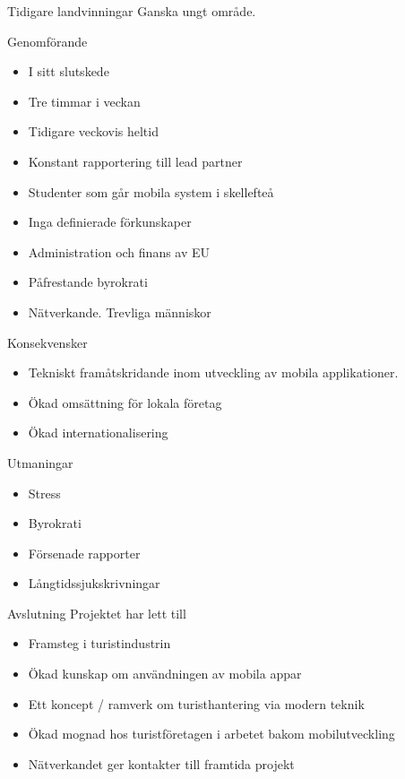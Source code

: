 \documentclass{beamer}
\begin{document}
	\begin{frame}{Tidigare landvinningar}
		Ganska ungt område.
	\end{frame}

	\begin{frame}{Genomförande}
		\begin{itemize}
			\item<1-> I sitt slutskede
			\item<2-> Tre timmar i veckan
			\item<3-> Tidigare veckovis heltid
			\item<4-> Konstant rapportering till lead partner
			\item<5-> Studenter som går mobila system i skellefteå
			\item<6-> Inga definierade förkunskaper
			\item<7-> Administration och finans av EU
			\item<8-> Påfrestande byrokrati
			\item<9-> Nätverkande. Trevliga människor
		\end{itemize}
	\end{frame}

	\begin{frame}{Konsekvensker}
		\begin{itemize}
			\item<1-> Tekniskt framåtskridande inom utveckling av mobila applikationer.
			\item<2-> Ökad omsättning för lokala företag
			\item<3-> Ökad internationalisering
		\end{itemize}
	\end{frame}

	\begin{frame}{Utmaningar}
		\begin{itemize}
			\item<1-> Stress
			\item<2-> Byrokrati 
			\item<3-> Försenade rapporter 
			\item<4-> Långtidssjukskrivningar
		\end{itemize}
	\end{frame}

	\begin{frame}{Avslutning}
		Projektet har lett till 
		\begin{itemize}[<+->]
			\item Framsteg i turistindustrin
			\item Ökad kunskap om användningen av mobila appar
			\item Ett koncept / ramverk om turisthantering via modern teknik
			\item Ökad mognad hos turistföretagen i arbetet bakom mobilutveckling
			\item Nätverkandet ger kontakter till framtida projekt
		\end{itemize}
	\end{frame}
\end{document}
